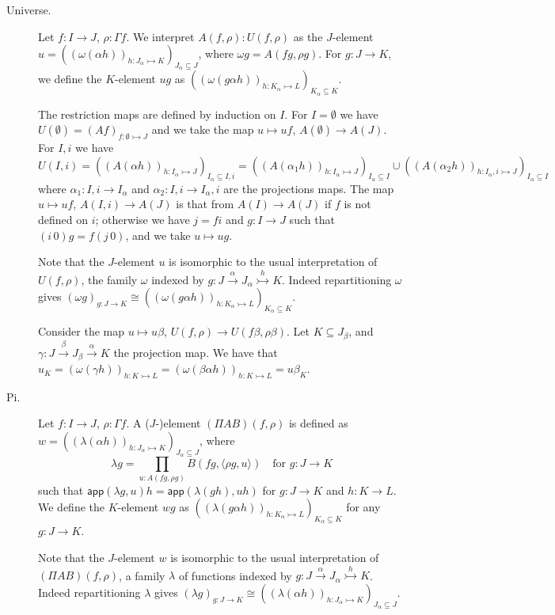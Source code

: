 \documentclass[english]{PaperTools/latex/lipics}
\def\app#1#2{\mathsf{app}(#1,#2)}
\begin{document}
\bigskip
\begin{description}
  \item[\sc Universe.]
    Let $f : I → J$, $ρ : Γf$.  We interpret $A(f,ρ) : U(f,ρ)$ as the
    $J$-element $u = \left(\left(ω(αh)\right)_{h : J_α ↣ K}\right)_{J_α ⊆ J}$,
    where $ωg = A(fg,ρg)$.
    For $g : J → K$, we define the $K$-element $u g$ as
    $\left(\left(ω(gαh)\right)_{h : K_α ↣ L}\right)_{K_α ⊆ K}$.

    The restriction maps are defined by induction on $I$.
    For $I = ∅$ we have $U(∅) = (Af)_{f:∅ ↣ J}$ and we take the map
    $u ↦ uf$, $A(∅) → A(J)$.
    For $I,i$ we have $U(I,i) = \left(\left(A(αh)\right)_{h : I_α ↣ J}\right)_{I_α ⊆ I,i}
    = \left(\left(A(α_1h)\right)_{h : I_α ↣ J}\right)_{I_α ⊆ I} ∪
      \left(\left(A(α_2h)\right)_{h : I_α,i ↣ J}\right)_{I_α ⊆ I}$
    where $α_1 : I,i → I_α$ and $α_2 : I,i → I_α,i$ are the projections
    maps.
    The map $u ↦ uf$, $A(I,i) → A(J)$ is
    that from $A(I) → A(J)$ if $f$ is not defined on $i$; otherwise
    we have $j = fi$ and $g : I→J$ such that $(i\,0)g = f(j\,0)$, and we
    take $u ↦ ug$.

    Note that the $J$-element $u$ is isomorphic to the usual interpretation of
    $U(f,ρ)$, the family $ω$ indexed by $g : J \stackrel{α}{→} J_α \stackrel {h}{↣} K$.
    Indeed repartitioning $ω$ gives
    $\left(ωg\right)_{g : J → K} ≅ \left(\left(ω(gαh)\right)_{h : K_α ↣ L}\right)_{K_α ⊆ K}$.

    Consider the map $u ↦ uβ$, $U(f,ρ) → U(fβ,ρβ)$.  Let
    $K ⊆ J_β$, and $γ : J \stackrel{β}{→} J_β \stackrel{α}{→} K$ the projection map.
    We have that
    $u_K = \left(ω(γh)\right)_{h : K ↣ L}
         = \left(ω(βαh)\right)_{h : K ↣ L}
         = uβ_K$.

  \item[\sc Pi.]
    Let $f : I → J$, $ρ : Γf$.  A ($J$-)element $(Π A B)(f,ρ)$ is defined as
    $w = \left(\left(λ(αh)\right)_{h : J_α ↣ K}\right)_{J_α ⊆ J}$,
    where
    $$λ g = \prod_{u : A(fg,ρg)} B(fg,⟨ρg,u⟩) \quad\text{for $g : J → K$}$$
    such that
    $\app{λg} u h = \app{λ(gh)}{uh}$ for $g : J → K$ and $h : K → L$.
    We define the $K$-element $w g$ as
    $\left(\left(λ(gαh)\right)_{h : K_α ↣ L}\right)_{K_α ⊆ K}$ for any $g : J → K$.

    Note that the $J$-element $w$ is isomorphic to the usual interpretation
    of $(ΠAB)(f,ρ)$, a family $λ$ of functions indexed by
    $g : J \stackrel{α}{→} J_α \stackrel {h}{↣} K$.  Indeed repartitioning $λ$ gives
    $\left(λg\right)_{g : J → K} ≅ \left(\left(λ(αh)\right)_{h : J_α ↣ K}\right)_{J_α ⊆ J}$.


\end{description}
\end{document}
